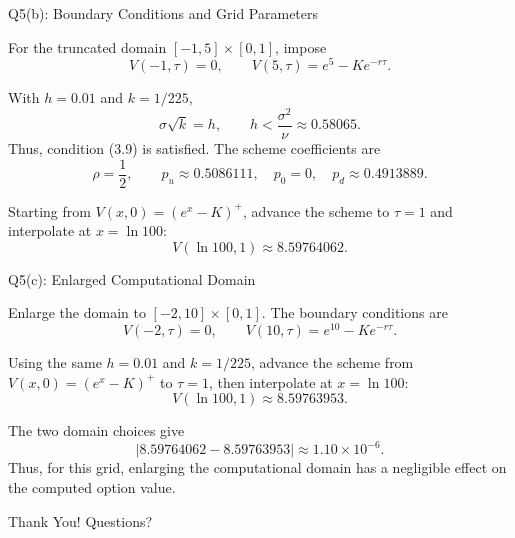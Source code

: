 \documentclass{beamer}
\begin{document}
\begin{frame}{Q5(b): Boundary Conditions and Grid Parameters}

For the truncated domain $[-1,5]\times[0,1]$, impose
\[
V(-1,\tau)=0,
\qquad
V(5,\tau)=e^5-Ke^{-r\tau}.
\]

With $h=0.01$ and $k=1/225$,
\[
\sigma\sqrt{k}=h,
\qquad
h<\frac{\sigma^2}{\nu}\approx0.58065.
\]
Thus, condition (3.9) is satisfied. The scheme coefficients are
\[
\rho=\frac12,\qquad
p_u\approx0.5086111,\quad
p_0=0,\quad
p_d\approx0.4913889.
\]

Starting from $V(x,0)=(e^x-K)^+$, advance the scheme to $\tau=1$
and interpolate at $x=\ln100$:
\[
\boxed{V(\ln100,1)\approx8.59764062.}
\]

\end{frame}


\begin{frame}{Q5(c): Enlarged Computational Domain}

Enlarge the domain to $[-2,10]\times[0,1]$. The boundary conditions are
\[
V(-2,\tau)=0,
\qquad
V(10,\tau)=e^{10}-Ke^{-r\tau}.
\]

Using the same $h=0.01$ and $k=1/225$, advance the scheme from
$V(x,0)=(e^x-K)^+$ to $\tau=1$, then interpolate at $x=\ln100$:
\[
\boxed{V(\ln100,1)\approx8.59763953.}
\]

The two domain choices give
\[
\left|8.59764062-8.59763953\right|
\approx1.10\times10^{-6}.
\]
Thus, for this grid, enlarging the computational domain has a negligible
effect on the computed option value.

\end{frame}




\begin{frame}\vfill\begin{center}{\LARGE Thank You! Questions?}\end{center}\vfill\end{frame}
\end{document}
